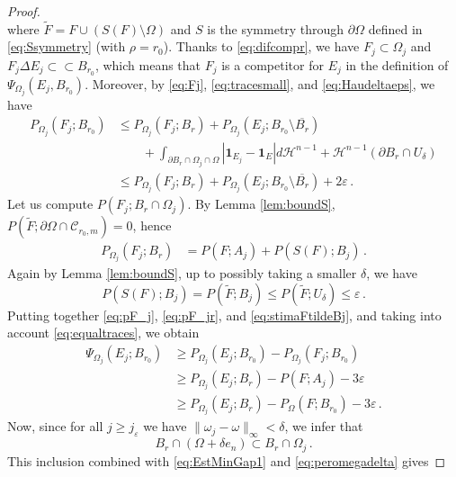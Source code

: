 \documentclass[10pt,a4paper]{amsart}
\newcommand{\Hau}{{\mathcal H}} %
\newcommand{\cC}{\mathcal{C}}
\newcommand{\ch}{\mathbf{1}}
\newcommand{\de}{\partial}
\newcommand{\difsim}{\Delta}
\newcommand{\e}{\varepsilon}
\newcommand{\pr}{P_{\Omega}}
\newcommand{\p}{P}
\begin{document}
\begin{proof}
\begin{equation}
\end{equation}
where $\tilde{F}=F\cup (S(F)\setminus \Omega)$ and $S$ is the symmetry through $\de \Omega$ defined in \eqref{eq:Ssymmetry} (with $\rho = r_{0}$). Thanks to \eqref{eq:difcompr}, we have $F_{j}\subset \Omega_{j}$ and $F_{j} \difsim E_{j} \subset \subset B_{r_{0}}$, which means that $F_{j}$ is a competitor for $E_{j}$ in the definition of $\Psi_{\Omega_{j}}(E_{j},B_{r_{0}})$. Moreover, by \eqref{eq:Fj}, \eqref{eq:tracesmall}, and \eqref{eq:Haudeltaeps}, we have
\begin{align} \nonumber
\p_{\Omega_{j}}(F_{j};B_{r_{0}}) & \le \p_{\Omega_{j}}(F_{j};B_{r}) + \p_{\Omega_{j}}(E_{j};B_{r_{0}} \setminus \overline{B_{r}}) \\
& \qquad + \int_{\de B_{r} \cap \Omega_{j}\cap \Omega} |\ch_{E_{j}} - \ch_{E}| d \Hau^{n-1} + \Hau^{n-1}(\de B_{r}\cap U_{\delta}) \nonumber \\
\label{eq:pF_j}
&\le \p_{\Omega_{j}}(F_{j};B_{r}) + \p_{\Omega_{j}}(E_{j};B_{r_{0}} \setminus \overline{B_{r}}) + 2\e\,.
\end{align}
Let us compute $\p(F_{j};B_{r} \cap \Omega_{j})$. By Lemma \ref{lem:boundS}, $\p(\tilde F;\de \Omega\cap \cC_{r_{0},m})=0$, hence
	    \begin{align} \label{eq:pF_jr}
	    	\p_{\Omega_{j}}(F_j;B_r) & = \p(F;A_j) + \p(S(F);B_j)\, .
	    \end{align}
        Again by Lemma \ref{lem:boundS}, up to possibly taking a smaller $\delta$, we have
\begin{equation}\label{eq:stimaFtildeBj}
\p(S(F);B_j) = \p(\tilde{F};B_{j}) \le \p(\tilde{F};U_\delta) \leq \e\,.
\end{equation}
Putting together \eqref{eq:pF_j}, \eqref{eq:pF_jr}, and \eqref{eq:stimaFtildeBj}, and taking into account \eqref{eq:equaltraces}, we obtain
\begin{align} \label{eq:EstMinGap1}
\Psi_{\Omega_{j}}(E_{j};B_{r_{0}}) & \geq \p_{\Omega_{j}}(E_{j};B_{r_{0}}) - \p_{\Omega_{j}}(F_{j};B_{r_{0}}) \\
			& \ge \p_{\Omega_{j}}(E_{j};B_{r}) - \p(F; A_{j}) -3\e\nonumber \\
			& \geq \p_{\Omega_{j}}(E_{j};B_{r}) - \pr(F;B_{r_{0}}) -3\e\, . \nonumber
		\end{align}
Now, since for all $j\ge j_{\e}$ we have $\|\omega_{j}-\omega\|_{\infty}<\delta$, we infer that
\[
B_{r}\cap (\Omega+\delta e_{n}) \subset B_{r}\cap \Omega_{j}\,.
\]
This inclusion combined with \eqref{eq:EstMinGap1} and \eqref{eq:peromegadelta} gives

\end{proof}
\end{document}

